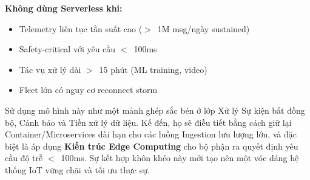 \noindent\textbf{Không dùng Serverless khi:}
\begin{itemize}
    \item Telemetry liên tục tần suất cao ($>$~1M msg/ngày sustained)
    \item Safety-critical với yêu cầu $<$~100ms
    \item Tác vụ xử lý dài $>$~15 phút (ML training, video)
    \item Fleet lớn có nguy cơ reconnect storm
\end{itemize}

Sử dụng mô hình này như một mảnh ghép sắc bén ở lớp Xử lý Sự kiện bất đồng bộ, Cảnh báo và Tiền xử lý dữ liệu. Kế đến, họ sẽ điều tiết bằng cách giữ lại Container/Microservices dài hạn cho các luồng Ingestion lưu lượng lớn, và đặc biệt là áp dụng \textbf{Kiến trúc Edge Computing} cho bộ phận ra quyết định yêu cầu độ trễ $<$~100ms. Sự kết hợp khôn khéo này mới tạo nên một vóc dáng hệ thống IoT vững chãi và tối ưu thực sự.
